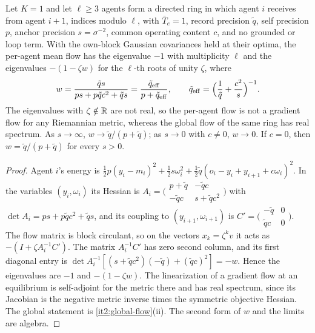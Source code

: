 \documentclass[11pt,letterpaper]{report}
\begin{document}
Let $K=1$ and let $\ell\geq3$ agents form a directed ring in which agent $i$ receives from agent $i+1$, indices modulo $\ell$, with $\bar T_e=1$, record precision $\tilde q$, self precision $p$, anchor precision $s=\sigma^{-2}$, common operating content $c$, and no grounded or loop term. With the own-block Gaussian covariances held at their optima, the per-agent mean flow has the eigenvalue $-1$ with multiplicity $\ell$ and the eigenvalues $-(1-\zeta w)$ for the $\ell$-th roots of unity $\zeta$, where
\begin{equation}
w=\frac{\tilde qs}{ps+p\tilde qc^2+\tilde qs}=\frac{\tilde q_{\mathrm{eff}}}{p+\tilde q_{\mathrm{eff}}},\qquad
\tilde q_{\mathrm{eff}}=\Bigl(\frac1{\tilde q}+\frac{c^2}s\Bigr)^{-1}.
\label{it2:ring-w}
\end{equation}
The eigenvalues with $\zeta\notin\mathbb R$ are not real, so the per-agent flow is not a gradient flow for any Riemannian metric, whereas the global flow of the same ring has real spectrum. As $s\to\infty$, $w\to\tilde q/(p+\tilde q)$; as $s\to0$ with $c\neq0$, $w\to0$. If $c=0$, then $w=\tilde q/(p+\tilde q)$ for every $s>0$.
\begin{proof}
Agent $i$'s energy is $\frac12p(y_i-m_i)^2+\frac12s\omega_i^2+\frac12\tilde q(o_i-y_i+y_{i+1}+c\omega_i)^2$. In the variables $(y_i,\omega_i)$ its Hessian is $A_i=\bigl(\begin{smallmatrix}p+\tilde q&-\tilde qc\\-\tilde qc&s+\tilde qc^2\end{smallmatrix}\bigr)$ with $\det A_i=ps+p\tilde qc^2+\tilde qs$, and its coupling to $(y_{i+1},\omega_{i+1})$ is $C'=\bigl(\begin{smallmatrix}-\tilde q&0\\\tilde qc&0\end{smallmatrix}\bigr)$. The flow matrix is block circulant, so on the vectors $x_k=\zeta^kv$ it acts as $-(I+\zeta A_i^{-1}C')$. The matrix $A_i^{-1}C'$ has zero second column, and its first diagonal entry is $\det A_i^{-1}[(s+\tilde qc^2)(-\tilde q)+(\tilde qc)^2]=-w$. Hence the eigenvalues are $-1$ and $-(1-\zeta w)$. The linearization of a gradient flow at an equilibrium is self-adjoint for the metric there and has real spectrum, since its Jacobian is the negative metric inverse times the symmetric objective Hessian. The global statement is \cref{it2:global-flow}(ii). The second form of $w$ and the limits are algebra.
\end{proof}
\end{document}
